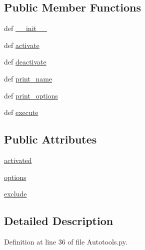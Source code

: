 \subsection*{Public Member Functions}
\begin{DoxyCompactItemize}
\item 
def \hyperlink{classAutotools_1_1Autotools_a5b5ac092ad7f4bc45bf785633c8be95a}{\-\_\-\-\_\-init\-\_\-\-\_\-}
\item 
def \hyperlink{classAutotools_1_1Autotools_a202b0e727db575d20a381cd039dd3597}{activate}
\item 
def \hyperlink{classAutotools_1_1Autotools_a74513a2f4135b506e66c047559f9571e}{deactivate}
\item 
def \hyperlink{classAutotools_1_1Autotools_a0873459245ef2255a5a7386957fa592e}{print\-\_\-name}
\item 
def \hyperlink{classAutotools_1_1Autotools_a41481e9f2a7e7fce32f51cc8feb909fd}{print\-\_\-options}
\item 
def \hyperlink{classAutotools_1_1Autotools_a5ae85e70e9e6252f4be23ef60624f633}{execute}
\end{DoxyCompactItemize}
\subsection*{Public Attributes}
\begin{DoxyCompactItemize}
\item 
\hyperlink{classAutotools_1_1Autotools_a6bbb714a91bc8b6fe749326772b073b3}{activated}
\item 
\hyperlink{classAutotools_1_1Autotools_a8b348e19f0a7104bde9c43c3a6ed695d}{options}
\item 
\hyperlink{classAutotools_1_1Autotools_aee37d9789ea22ee310ebc357cd721b7f}{exclude}
\end{DoxyCompactItemize}


\subsection{Detailed Description}


Definition at line 36 of file Autotools.\-py.



